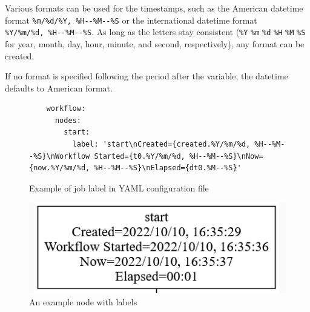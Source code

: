 Various formats can be used for the timestamps, such as the American
datetime format \texttt{\%m/\%d/\%Y,\ \%H-\/-\%M-\/-\%S} or the
international datetime format \texttt{\%Y/\%m/\%d,\ \%H-\/-\%M-\/-\%S}.
As long as the letters stay consistent (\texttt{\%Y} \texttt{\%m}
\texttt{\%d} \texttt{\%H} \texttt{\%M} \texttt{\%S} for year, month,
day, hour, minute, and second, respectively), any format can be created.

If no format is specified following the period after the variable, the
datetime defaults to American format.


\begin{figure}
\smallskip
    \begin{verbatim}
    workflow:
      nodes:
        start:
          label: 'start\nCreated={created.%Y/%m/%d, %H--%M--%S}\nWorkflow Started={t0.%Y/%m/%d, %H--%M--%S}\nNow={now.%Y/%m/%d, %H--%M--%S}\nElapsed={dt0.%M--%S}'
    \end{verbatim}
    \caption{Example of job label in YAML configuration file}
    \label{fig:label-job}

\centering
\includegraphics[width=0.7\columnwidth]{images/labelmaker-example.png}
\caption{An example node with labels}\label{fig:label-node}
\end{figure}

